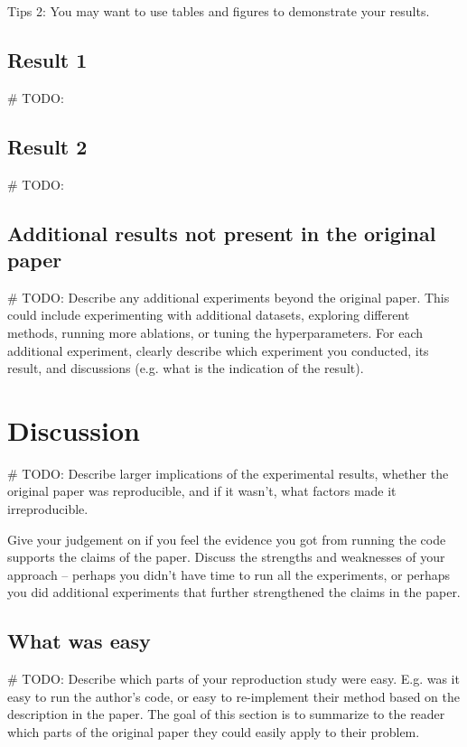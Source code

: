 \documentclass[11pt,a4paper]{article}
\begin{document}
Tips 2: You may want to use tables and figures to demonstrate your results.


\subsection{Result 1}
\# TODO:

\subsection{Result 2}
\# TODO:

\subsection{Additional results not present in the original paper}
\# TODO:
Describe any additional experiments beyond the original paper. This could include experimenting with additional datasets, exploring different methods, running more ablations, or tuning the hyperparameters. For each additional experiment, clearly describe which experiment you conducted, its result, and discussions (e.g. what is the indication of the result).

\section{Discussion}
\# TODO:
Describe larger implications of the experimental results, whether the original paper was reproducible, and if it wasn’t, what factors made it irreproducible. 

Give your judgement on if you feel the evidence you got from running the code supports the claims of the paper. Discuss the strengths and weaknesses of your approach -- perhaps you didn't have time to run all the experiments, or perhaps you did additional experiments that further strengthened the claims in the paper.

\subsection{What was easy}
\# TODO:
Describe which parts of your reproduction study were easy. E.g. was it easy to run the author's code, or easy to re-implement their method based on the description in the paper. The goal of this section is to summarize to the reader which parts of the original paper they could easily apply to their problem. 
\end{document}
